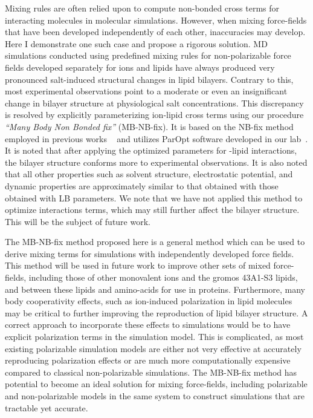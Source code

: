 Mixing rules are often relied upon to compute non-bonded cross terms 
for interacting molecules in molecular simulations. 
However, when mixing force-fields that have been developed independently of each other, 
inaccuracies may develop. 
Here I demonstrate one such case and propose a rigorous solution. 
MD simulations conducted using predefined mixing rules for 
non-polarizable force fields developed separately for ions and lipids 
have always produced very pronounced salt-induced structural changes in lipid bilayers. 
Contrary to this, most experimental observations point to a 
moderate or even an insignificant change in bilayer structure at physiological salt concentrations. 
This discrepancy is resolved by explicitly parameterizing ion-lipid cross terms
using our procedure {\em ``Many Body Non Bonded fix''} (MB-NB-fix). 
It is based on the NB-fix method employed in previous works
~\cite{baker:2010:accurate,yoo:2012:improved,fyta:2012:ionic,mamatkulov:2013:force,venable:2013,savelyev:2014:balancing,li:2015:representation,savelyev:2015:competition,jing:2017:study}
and utilizes ParOpt software developed in our lab~\cite{fogarty:2014:paropt}\cite{fogarty:2014:thesis}.
It is noted that after applying the optimized parameters for \na-lipid interactions, the 
bilayer structure conforms more to experimental
observations. It is also noted that all other properties such as solvent structure,
electrostatic potential, and dynamic properties are approximately
similar to that obtained with those obtained with LB parameters. 
We note that we have not applied this method to optimize \cl{} interactions terms, which
may still further affect the bilayer structure. This will be the subject of future work.

The MB-NB-fix method proposed here is a 
general method which can be used to derive mixing
terms for simulations with independently developed force fields. 
This method will be used in future work to improve other sets of mixed force-fields, including 
those of other monovalent ions and the gromos 43A1-S3 lipids, and between these lipids and amino-acids for use in proteins.
Furthermore, many body cooperativity effects, such as ion-induced polarization 
in lipid molecules may be critical to further improving
the reproduction of lipid bilayer structure.
A correct approach to incorporate these effects to simulations 
would be to have explicit polarization terms in 
the simulation model. This is complicated, as most existing polarizable 
simulation models are either not very effective
at accurately reproducing polarization effects or are
much more computationally expensive compared
to classical non-polarizable simulations. The MB-NB-fix method
has potential to become an ideal solution for mixing force-fields, including
polarizable and non-polarizable models in the same system 
to construct simulations that are tractable yet accurate.
\FloatBarrier



